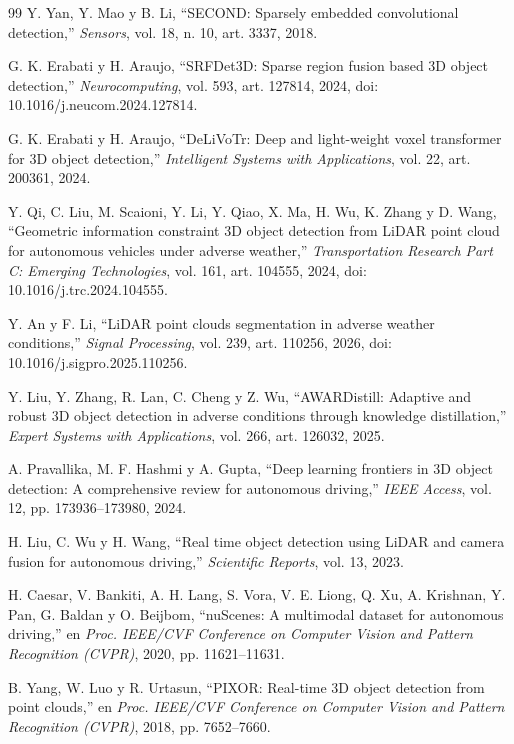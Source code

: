 \documentclass[11pt,letterpaper]{article}
\begin{document}
\begin{thebibliography}{99}
Y. Yan, Y. Mao y B. Li, ``SECOND: Sparsely embedded convolutional detection,'' \emph{Sensors}, vol. 18, n.\textordmasculine{} 10, art. 3337, 2018.

G. K. Erabati y H. Araujo, ``SRFDet3D: Sparse region fusion based 3D object detection,'' \emph{Neurocomputing}, vol. 593, art. 127814, 2024, doi: 10.1016/j.neucom.2024.127814.

G. K. Erabati y H. Araujo, ``DeLiVoTr: Deep and light-weight voxel transformer for 3D object detection,'' \emph{Intelligent Systems with Applications}, vol. 22, art. 200361, 2024.

Y. Qi, C. Liu, M. Scaioni, Y. Li, Y. Qiao, X. Ma, H. Wu, K. Zhang y D. Wang, ``Geometric information constraint 3D object detection from LiDAR point cloud for autonomous vehicles under adverse weather,'' \emph{Transportation Research Part C: Emerging Technologies}, vol. 161, art. 104555, 2024, doi: 10.1016/j.trc.2024.104555.

Y. An y F. Li, ``LiDAR point clouds segmentation in adverse weather conditions,'' \emph{Signal Processing}, vol. 239, art. 110256, 2026, doi: 10.1016/j.sigpro.2025.110256.

Y. Liu, Y. Zhang, R. Lan, C. Cheng y Z. Wu, ``AWARDistill: Adaptive and robust 3D object detection in adverse conditions through knowledge distillation,'' \emph{Expert Systems with Applications}, vol. 266, art. 126032, 2025.

A. Pravallika, M. F. Hashmi y A. Gupta, ``Deep learning frontiers in 3D object detection: A comprehensive review for autonomous driving,'' \emph{IEEE Access}, vol. 12, pp. 173936--173980, 2024.

H. Liu, C. Wu y H. Wang, ``Real time object detection using LiDAR and camera fusion for autonomous driving,'' \emph{Scientific Reports}, vol. 13, 2023.

H. Caesar, V. Bankiti, A. H. Lang, S. Vora, V. E. Liong, Q. Xu, A. Krishnan, Y. Pan, G. Baldan y O. Beijbom, ``nuScenes: A multimodal dataset for autonomous driving,'' en \emph{Proc. IEEE/CVF Conference on Computer Vision and Pattern Recognition (CVPR)}, 2020, pp. 11621--11631.

B. Yang, W. Luo y R. Urtasun, ``PIXOR: Real-time 3D object detection from point clouds,'' en \emph{Proc. IEEE/CVF Conference on Computer Vision and Pattern Recognition (CVPR)}, 2018, pp. 7652--7660.


\end{thebibliography}
\end{document}
